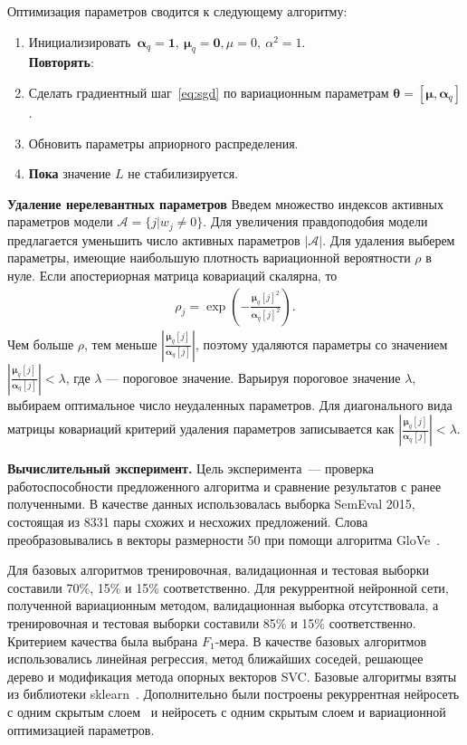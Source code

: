 Оптимизация параметров сводится к следующему алгоритму:\\
\begin{enumerate}
\item Инициализировать~$\boldsymbol{\alpha}_q = \textbf{1}, \ \boldsymbol{\mu}_q = \textbf{0}, {\mu} = 0, \ \alpha^2 = 1$.\\
{\textbf{Повторять}}:\\
\item Сделать градиентный шаг~\eqref{eq:sgd} по вариационным параметрам $\boldsymbol{\theta} = [\boldsymbol{\mu}, \boldsymbol{\alpha}_q]$.
\item Обновить параметры априорного распределения.\\
\item {\textbf{Пока}} значение $L$ не стабилизируется.
\end{enumerate}

\textbf{Удаление нерелевантных параметров}
Введем множество индексов активных параметров модели $\mathcal{A} = \{j | w_j \neq 0\} $. Для увеличения правдоподобия модели предлагается уменьшить число активных параметров $|\mathcal{A}|$. Для удаления выберем параметры, имеющие наибольшую плотность вариационной вероятности $\rho$ в нуле.
Если апостериорная матрица ковариаций скалярна, то  
\begin{gather}
\rho_j = \exp\left(-\frac{\boldsymbol{\mu}_{q}[j]^2}{\boldsymbol{\alpha}_{q}[j]^2}\right).
\end{gather}
Чем больше $\rho$, тем меньше $|\frac{\boldsymbol{\mu}_{q}[j]}{\boldsymbol{\alpha}_{q}[j]}|$, поэтому удаляются параметры со значением $|\frac{\boldsymbol{\mu}_{q}[j]}{\boldsymbol{\alpha}_{q}[j]}| < \lambda$, где $\lambda$ --- пороговое значение. Варьируя пороговое значение $\lambda$, выбираем оптимальное число неудаленных параметров.
Для диагонального вида матрицы ковариаций критерий удаления параметров записывается как $|\frac{\boldsymbol{\mu}_{q}[j]}{\boldsymbol{\alpha}_{q}[j]}| < \lambda$.

\textbf{Вычислительный эксперимент. }
Цель эксперимента~--- проверка работоспособности предложенного алгоритма и сравнение результатов с ранее полученными. В качестве данных использовалась выборка SemEval 2015, состоящая из 8331 пары схожих и несхожих предложений. Слова преобразовывались в векторы размерности 50 при помощи алгоритма GloVe~\cite{glove}.

Для базовых алгоритмов тренировочная, валидационная и тестовая выборки составили 70\%, 15\% и 15\% соответственно.
Для рекуррентной нейронной сети, полученной вариационным методом, валидационная выборка отсутствовала, а тренировочная и тестовая выборки составили 85\% и 15\% соответственно.
Критерием качества была выбрана $F_1$-мера.
В качестве базовых алгоритмов использовались линейная регрессия, метод ближайших соседей, решающее дерево и модификация метода опорных векторов SVC. Базовые алгоритмы взяты из библиотеки sklearn~\cite{sklearn}. 
Дополнительно были построены рекуррентная нейросеть с одним скрытым слоем~\cite{sanborn} и нейросеть с одним скрытым слоем и вариационной оптимизацией параметров.


